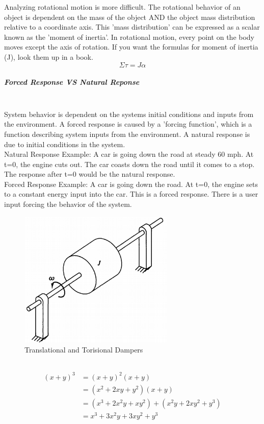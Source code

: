 \documentclass[paper=a4, fontsize=11pt]{scrartcl} %
\numberwithin{equation}{section} %
\numberwithin{figure}{section} %
\numberwithin{table}{section} %
\begin{document}
Analyzing rotational motion is more difficult. The rotational behavior of an object is dependent on the mass of the object AND the object mass distribution relative to a coordinate axis. This 'mass distribution' can be expressed as a scalar known as the 'moment of inertia'. In rotational motion, every point on the body moves except the axis of rotation. If you want the formulas for moment of inertia (J), look them up in a book. \\

$$\Sigma \tau = J \alpha$$

\subparagraph{Forced Response VS Natural Reponse}~ \\
System behavior is dependent on the systems initial conditions and inputs from the environment. A forced response is caused by a 'forcing function', which is a function describing system inputs from the environment. A natural response is due to initial conditions in the system. \\
Natural Response Example: A car is going down the road at steady 60 mph. At t=0, the engine cuts out. The car coasts down the road until it comes to a stop. The response after t=0 would be the natural response. \\
Forced Response Example: A car is going down the road. At t=0, the engine sets to a constant energy input into the car. This is a forced response. There is a user input forcing the behavior of the system. \\

\begin{figure}
\begin{center}
  \includegraphics[width=20em]{Example_1}
  \caption{Translational and Torisional Dampers}
  \label{fig:boat1}
\end{center}
\end{figure}

$$$$

\begin{align} 
\begin{split}
(x+y)^3 	&= (x+y)^2(x+y)\\
&=(x^2+2xy+y^2)(x+y)\\
&=(x^3+2x^2y+xy^2) + (x^2y+2xy^2+y^3)\\
&=x^3+3x^2y+3xy^2+y^3
\end{split}					
\end{align}
\end{document}
